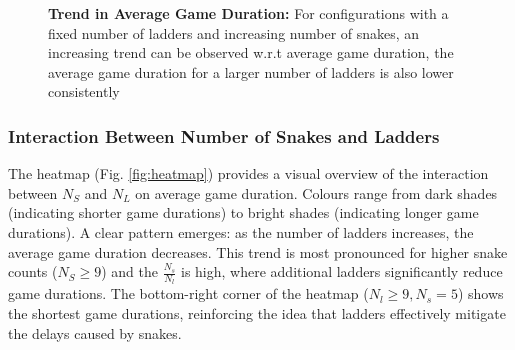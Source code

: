 	\begin{figure}[th]
			\centering
			\caption{\textbf{Trend in Average Game Duration:} For configurations with a fixed number of ladders and increasing number of snakes, an increasing trend can be observed w.r.t average game duration, the average game duration for a larger number of ladders is also lower consistently}
			\label{fig:avg_game_times_trend}
		\end{figure}
	

\subsubsection{Interaction Between Number of Snakes and Ladders}

The heatmap (Fig. \ref{fig:heatmap}) provides a visual overview of the interaction between $N_S$ and $N_L$ on average game duration. Colours range from dark shades (indicating shorter game durations) to bright shades (indicating longer game durations). A clear pattern emerges: as the number of ladders increases, the average game duration decreases. This trend is most pronounced for higher snake counts ($N_S \geq 9$) and the $\frac{N_s}{N_l}$ is high, where additional ladders significantly reduce game durations. The bottom-right corner of the heatmap ($N_l \geq 9, N_s = 5$) shows the shortest game durations, reinforcing the idea that ladders effectively mitigate the delays caused by snakes.

